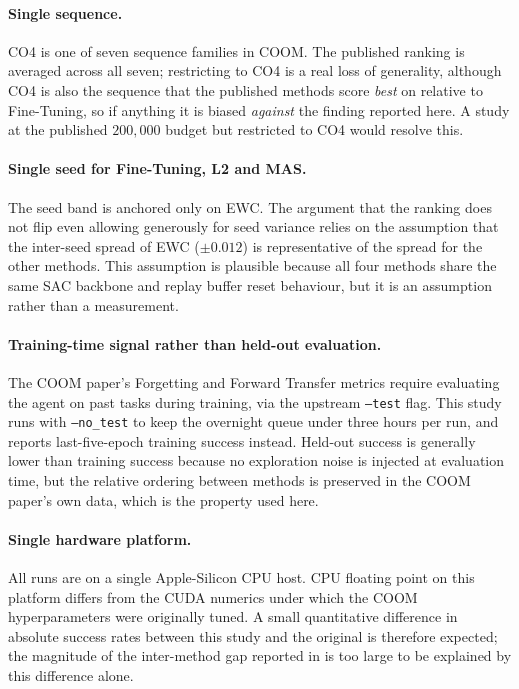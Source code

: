 \paragraph{Single sequence.}
CO4 is one of seven sequence families in COOM. The published
ranking is averaged across all seven; restricting to CO4 is a
real loss of generality, although CO4 is also the sequence that
the published methods score \emph{best} on relative to
Fine-Tuning, so if anything it is biased \emph{against} the
finding reported here. A study at the published $200{,}000$
budget but restricted to CO4 would resolve this.

\paragraph{Single seed for Fine-Tuning, L2 and MAS.}
The seed band is anchored only on EWC. The argument that the
ranking does not flip even allowing generously for seed variance
relies on the assumption that the inter-seed spread of EWC
(${\pm}0.012$) is representative of the spread for the other
methods. This assumption is plausible because all four methods
share the same SAC backbone and replay buffer reset behaviour,
but it is an assumption rather than a measurement.

\paragraph{Training-time signal rather than held-out
evaluation.}
The COOM paper's Forgetting and Forward Transfer metrics
require evaluating the agent on past tasks during training, via
the upstream \texttt{--test} flag. This study runs with
\texttt{--no\_test} to keep the overnight queue under three
hours per run, and reports last-five-epoch training success
instead. Held-out success is generally lower than training
success because no exploration noise is injected at evaluation
time, but the relative ordering between methods is preserved in
the COOM paper's own data, which is the property used here.

\paragraph{Single hardware platform.}
All runs are on a single Apple-Silicon CPU host. CPU floating
point on this platform differs from the CUDA numerics under
which the COOM hyperparameters were originally tuned. A small
quantitative difference in absolute success rates between this
study and the original is therefore expected; the magnitude of
the inter-method gap reported in  is too
large to be explained by this difference alone.

